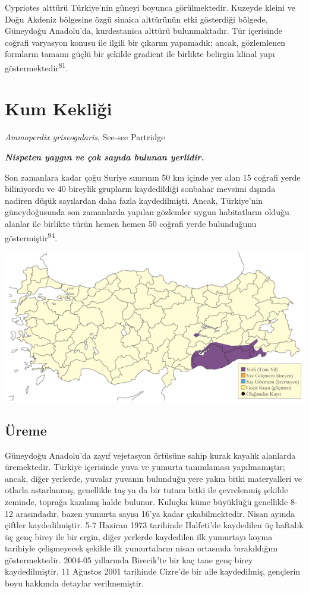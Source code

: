 \documentclass[
  letterpaper,
  DIV=11,
  numbers=noendperiod]{scrreprt}
\begin{document}
Cypriotes alttürü Türkiye'nin güneyi boyunca görülmektedir. Kuzeyde
kleini ve Doğu Akdeniz bölgesine özgü sinaica alttürünün etki gösterdiği
bölgede, Güneydoğu Anadolu'da, kurdestanica alttürü bulunmaktadır. Tür
içerisinde coğrafi varyasyon konusu ile ilgili bir çıkarım yapamadık;
ancak, gözlemlenen formların tamamı güçlü bir şekilde gradient ile
birlikte belirgin klinal yapı göstermektedir\textsuperscript{81}.

\hypertarget{kum-kekliux11fi}{%
\section{Kum Kekliği}\label{kum-kekliux11fi}}

\emph{Ammoperdix griseogularis}, See-see Partridge

\textbf{\emph{Nispeten yaygın ve çok sayıda bulunan yerlidir.}}

Son zamanlara kadar çoğu Suriye sınırının 50 km içinde yer alan 15
coğrafi yerde biliniyordu ve 40 bireylik grupların kaydedildiği sonbahar
mevsimi dışında nadiren düşük sayılardan daha fazla kaydedilmişti.
Ancak, Türkiye'nin güneydoğusunda son zamanlarda yapılan gözlemler uygun
habitatların olduğu alanlar ile birlikte türün hemen hemen 50 coğrafi
yerde bulunduğunu göstermiştir\textsuperscript{94}.

\includegraphics{images/harita_Page_040.png}

\hypertarget{uxfcreme-39}{%
\subsection{\texorpdfstring{\textbf{Üreme}}{Üreme}}\label{uxfcreme-39}}

Güneydoğu Anadolu'da zayıf vejetasyon örtüsüne sahip kurak kayalık
alanlarda üremektedir. Türkiye içerisinde yuva ve yumurta tanımlaması
yapılmamıştır; ancak, diğer yerlerde, yuvalar yuvanın bulunduğu yere
yakın bitki materyalleri ve otlarla astarlanmış, genellikle taş ya da
bir tutam bitki ile çevrelenmiş şekilde zeminde, toprağa kazılmış halde
bulunur. Kuluçka küme büyüklüğü genellikle 8-12 arasındadır, bazen
yumurta sayısı 16'ya kadar çıkabilmektedir. Nisan ayında çiftler
kaydedilmiştir. 5-7 Haziran 1973 tarihinde Halfeti'de kaydedilen üç
haftalık üç genç birey ile bir ergin, diğer yerlerde kaydedilen ilk
yumurtayı koyma tarihiyle çelişmeyecek şekilde ilk yumurtaların nisan
ortasında bırakıldığını göstermektedir. 2004-05 yıllarında Birecik'te
bir kaç tane genç birey kaydedilmiştir. 11 Ağustos 2001 tarihinde
Cizre'de bir aile kaydedilmiş, gençlerin boyu hakkında detaylar
verilmemiştir.
\end{document}
